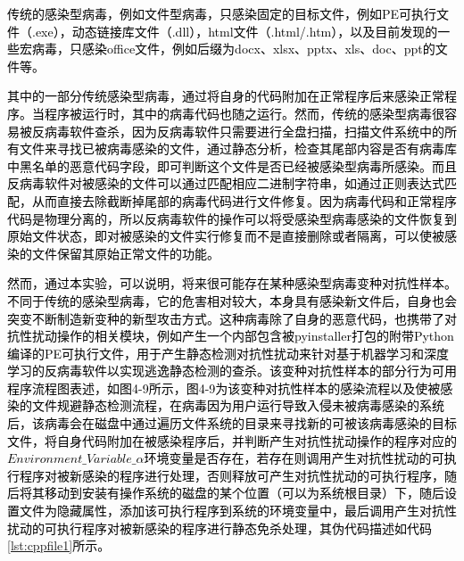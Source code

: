 \textcolor{black}{传统的感染型病毒，例如文件型病毒，只感染固定的目标文件\cite{ref37}，例如PE可执行文件（.exe），动态链接库文件（.dll），html文件（.html/.htm），以及目前发现的一些宏病毒，只感染office文件，例如后缀为docx、xlsx、pptx、xls、doc、ppt的文件等。}

\textcolor{black}{其中的一部分传统感染型病毒，通过将自身的代码附加在正常程序后来感染正常程序。当程序被运行时，其中的病毒代码也随之运行。然而，传统的感染型病毒很容易被反病毒软件查杀，因为反病毒软件只需要进行全盘扫描，扫描文件系统中的所有文件来寻找已被病毒感染的文件，通过静态分析，检查其尾部内容是否有病毒库中黑名单的恶意代码字段，即可判断这个文件是否已经被感染型病毒所感染。而且反病毒软件对被感染的文件可以通过匹配相应二进制字符串，如通过正则表达式匹配，从而直接去除截断掉尾部的病毒代码进行文件修复。因为病毒代码和正常程序代码是物理分离的，所以反病毒软件的操作可以将受感染型病毒感染的文件恢复到原始文件状态，即对被感染的文件实行修复而不是直接删除或者隔离，可以使被感染的文件保留其原始正常文件的功能。}

\textcolor{black}{然而，通过本实验，可以说明，将来很可能存在某种感染型病毒变种对抗性样本。不同于传统的感染型病毒，它的危害相对较大，本身具有感染新文件后，自身也会突变不断制造新变种的新型攻击方式。这种病毒除了自身的恶意代码，也携带了对抗性扰动操作的相关模块，例如产生一个内部包含被pyinstaller打包的附带Python编译的PE可执行文件，用于产生静态检测对抗性扰动来针对基于机器学习和深度学习的反病毒软件以实现逃逸静态检测的查杀。该变种对抗性样本的部分行为可用程序流程图表述，如图4-9所示，图4-9为该变种对抗性样本的感染流程以及使被感染的文件规避静态检测流程，在病毒因为用户运行导致入侵未被病毒感染的系统后，该病毒会在磁盘中通过遍历文件系统的目录来寻找新的可被该病毒感染的目标文件，将自身代码附加在被感染程序后，并判断产生对抗性扰动操作的程序对应的$Environment\_Variable\_\alpha$环境变量是否存在，若存在则调用产生对抗性扰动的可执行程序对被新感染的程序进行处理，否则释放可产生对抗性扰动的可执行程序，随后将其移动到安装有操作系统的磁盘的某个位置（可以为系统根目录）下，随后设置文件为隐藏属性，添加该可执行程序到系统的环境变量中，最后调用产生对抗性扰动的可执行程序对被新感染的程序进行静态免杀处理，其伪代码描述如代码\ref{lst:cppfile1}所示。}

